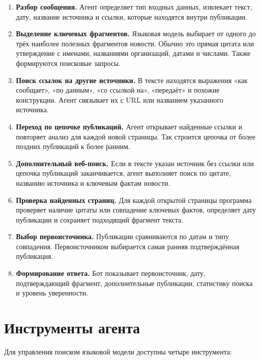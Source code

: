 \documentclass[11pt,a4paper]{article}
\begin{document}
\begin{enumerate}[leftmargin=2em]
    \item \textbf{Разбор сообщения.} Агент определяет тип входных данных, извлекает текст, дату, название источника и ссылки, которые находятся внутри публикации.

    \item \textbf{Выделение ключевых фрагментов.} Языковая модель выбирает от одного до трёх наиболее полезных фрагментов новости. Обычно это прямая цитата или утверждение с именами, названиями организаций, датами и числами. Также формируются поисковые запросы.

    \item \textbf{Поиск ссылок на другие источники.} В тексте находятся выражения «как сообщает», «по данным», «со ссылкой на», «передаёт» и похожие конструкции. Агент связывает их с URL или названием указанного источника.

    \item \textbf{Переход по цепочке публикаций.} Агент открывает найденные ссылки и повторяет анализ для каждой новой страницы. Так строится цепочка от более поздних публикаций к более ранним.

    \item \textbf{Дополнительный веб-поиск.} Если в тексте указан источник без ссылки или цепочка публикаций заканчивается, агент выполняет поиск по цитате, названию источника и ключевым фактам новости.

    \item \textbf{Проверка найденных страниц.} Для каждой открытой страницы программа проверяет наличие цитаты или совпадение ключевых фактов, определяет дату публикации и сохраняет подходящий фрагмент текста.

    \item \textbf{Выбор первоисточника.} Публикации сравниваются по датам и типу совпадения. Первоисточником выбирается самая ранняя подтверждённая публикация.

    \item \textbf{Формирование ответа.} Бот показывает первоисточник, дату, подтверждающий фрагмент, дополнительные публикации, статистику поиска и уровень уверенности.
\end{enumerate}

\section*{Инструменты агента}

Для управления поиском языковой модели доступны четыре инструмента:
\end{document}
